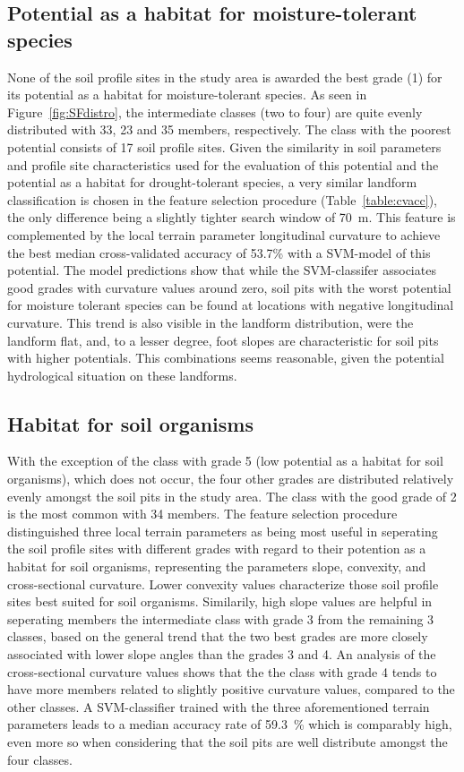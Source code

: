 \documentclass[preprint,12pt,authoryear]{elsarticle}
\begin{document}
\subsection{Potential as a habitat for moisture-tolerant species}
None of the soil profile sites in the study area is awarded the best grade (1) for its potential as a habitat for moisture-tolerant species. As seen in Figure~\ref{fig:SFdistro}, the intermediate classes (two to four) are quite evenly distributed with 33, 23 and 35 members, respectively. The class with the poorest potential consists of 17 soil profile sites.  Given the similarity in soil parameters and profile site characteristics used for the evaluation of this potential and the potential as a habitat for drought-tolerant species, a very similar landform classification is chosen in the feature selection procedure (Table~\ref{table:cvacc}), the only difference being a slightly tighter search window of 70~m. This feature is complemented by the local terrain parameter longitudinal curvature to achieve the best median cross-validated accuracy  of 53.7\% with a SVM-model of this potential. The model predictions show that while the SVM-classifer associates good grades with curvature values around zero, soil pits with the worst potential for moisture tolerant species can be found at locations with negative longitudinal curvature. This trend is also visible in the landform distribution, were the landform flat, and, to a lesser degree, foot slopes are characteristic for soil pits with higher potentials. This combinations seems reasonable, given the potential hydrological situation on these landforms.

\subsection{Habitat for soil organisms}
With the exception of the class with grade 5 (low potential as a habitat for soil organisms), which does not occur, the four other grades are distributed relatively evenly amongst the soil pits in the study area. The class with the good grade of 2 is the most common with 34 members. The feature selection procedure distinguished three local terrain parameters as being most useful in seperating the soil profile sites with different grades with regard to their potention as a habitat for  soil organisms, representing the parameters slope, convexity, and cross-sectional curvature. Lower convexity values characterize those soil profile sites best suited for soil organisms. Similarily, high slope values are helpful in seperating members the intermediate class with grade 3 from the remaining 3 classes, based on the general trend that the two best grades are more closely associated with lower slope angles than the grades 3 and 4. An analysis of the cross-sectional curvature values shows that the  the class with grade 4 tends to have more members related to slightly positive curvature values, compared to the other classes. A SVM-classifier trained with the three aforementioned terrain parameters leads to a median accuracy rate of 59.3~\% which is comparably high, even more so when considering that the soil pits are well distribute amongst the four classes. 
\end{document}
